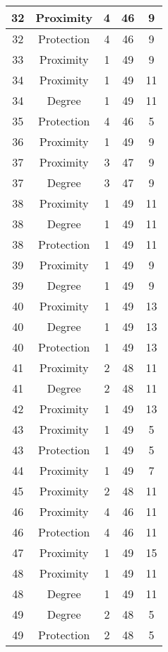 \documentclass[results.tex]{subfiles}
\begin{document}
\begin{center}
\begin{tabular}{| c || c | c | c | c |}
    \hline
    32 & Proximity & 4 & 46 & 9 \\ 
    \hline
    32 & Protection & 4 & 46 & 9 \\ 
    \hline
    33 & Proximity & 1 & 49 & 9 \\ 
    \hline
    34 & Proximity & 1 & 49 & 11 \\ 
    \hline
    34 & Degree & 1 & 49 & 11 \\ 
    \hline
    35 & Protection & 4 & 46 & 5 \\ 
    \hline
    36 & Proximity & 1 & 49 & 9 \\ 
    \hline
    37 & Proximity & 3 & 47 & 9 \\ 
    \hline
    37 & Degree & 3 & 47 & 9 \\ 
    \hline
    38 & Proximity & 1 & 49 & 11 \\ 
    \hline
    38 & Degree & 1 & 49 & 11 \\ 
    \hline
    38 & Protection & 1 & 49 & 11 \\ 
    \hline
    39 & Proximity & 1 & 49 & 9 \\ 
    \hline
    39 & Degree & 1 & 49 & 9 \\ 
    \hline
    40 & Proximity & 1 & 49 & 13 \\ 
    \hline
    40 & Degree & 1 & 49 & 13 \\ 
    \hline
    40 & Protection & 1 & 49 & 13 \\ 
    \hline
    41 & Proximity & 2 & 48 & 11 \\ 
    \hline
    41 & Degree & 2 & 48 & 11 \\ 
    \hline
    42 & Proximity & 1 & 49 & 13 \\ 
    \hline
    43 & Proximity & 1 & 49 & 5 \\ 
    \hline
    43 & Protection & 1 & 49 & 5 \\ 
    \hline
    44 & Proximity & 1 & 49 & 7 \\ 
    \hline
    45 & Proximity & 2 & 48 & 11 \\ 
    \hline
    46 & Proximity & 4 & 46 & 11 \\ 
    \hline
    46 & Protection & 4 & 46 & 11 \\ 
    \hline
    47 & Proximity & 1 & 49 & 15 \\ 
    \hline
    48 & Proximity & 1 & 49 & 11 \\ 
    \hline
    48 & Degree & 1 & 49 & 11 \\ 
    \hline
    49 & Degree & 2 & 48 & 5 \\ 
    \hline
    49 & Protection & 2 & 48 & 5 \\ 
    \hline   \end{tabular}
\end{center}
\end{document}
